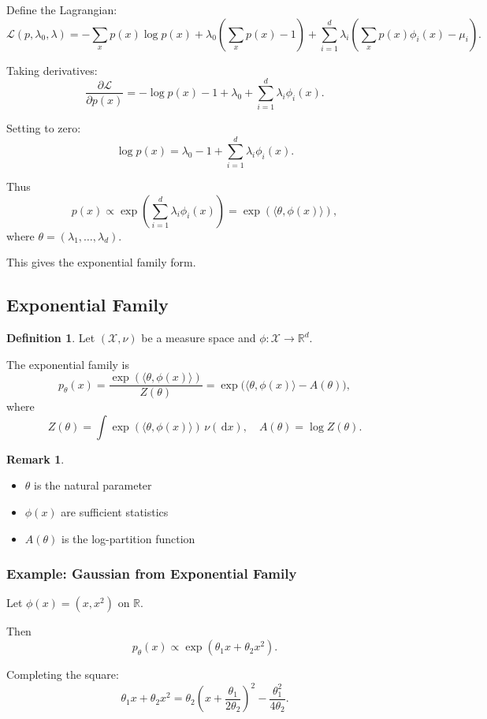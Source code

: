 \documentclass[12pt,oneside]{book}
\numberwithin{equation}{section}
\theoremstyle{definition}
\newtheorem{definition}{Definition}[section]
\newtheorem{remark}{Remark}[section]
\theoremstyle{plain}
\theoremstyle{remark}
\newcommand{\R}{\mathbb{R}}
\newcommand{\dd}{\,\mathrm{d}}
\begin{document}
Define the Lagrangian:
\[
\mathcal{L}(p,\lambda_0,\lambda)
=
-\sum_x p(x)\log p(x)
+ \lambda_0\left(\sum_x p(x)-1\right)
+ \sum_{i=1}^d \lambda_i\left(\sum_x p(x)\phi_i(x)-\mu_i\right).
\]

Taking derivatives:
\[
\frac{\partial \mathcal{L}}{\partial p(x)}
=
-\log p(x) - 1 + \lambda_0 + \sum_{i=1}^d \lambda_i \phi_i(x).
\]

Setting to zero:
\[
\log p(x)
=
\lambda_0 - 1 + \sum_{i=1}^d \lambda_i \phi_i(x).
\]

Thus
\[
p(x)
\propto
\exp\left(\sum_{i=1}^d \lambda_i \phi_i(x)\right)
=
\exp(\langle \theta, \phi(x)\rangle),
\]
where $\theta = (\lambda_1,\dots,\lambda_d)$.

This gives the exponential family form.


\subsection{Exponential Family}

\begin{definition}
Let $(\mathcal{X},\nu)$ be a measure space and $\phi : \mathcal{X} \to \R^d$.

The exponential family is
\[
p_\theta(x)
=
\frac{\exp(\langle \theta,\phi(x)\rangle)}{Z(\theta)}
=
\exp\big(\langle \theta,\phi(x)\rangle - A(\theta)\big),
\]
where
\[
Z(\theta) = \int \exp(\langle \theta,\phi(x)\rangle)\,\nu(\dd x),
\quad
A(\theta) = \log Z(\theta).
\]
\end{definition}

\begin{remark}
\begin{itemize}
\item $\theta$ is the natural parameter
\item $\phi(x)$ are sufficient statistics
\item $A(\theta)$ is the log-partition function
\end{itemize}
\end{remark}


\subsubsection{Example: Gaussian from Exponential Family}

Let $\phi(x) = (x, x^2)$ on $\R$.

Then
\[
p_\theta(x)
\propto
\exp(\theta_1 x + \theta_2 x^2).
\]

Completing the square:
\[
\theta_1 x + \theta_2 x^2
=
\theta_2 \left(x + \frac{\theta_1}{2\theta_2}\right)^2
- \frac{\theta_1^2}{4\theta_2}.
\]
\end{document}
